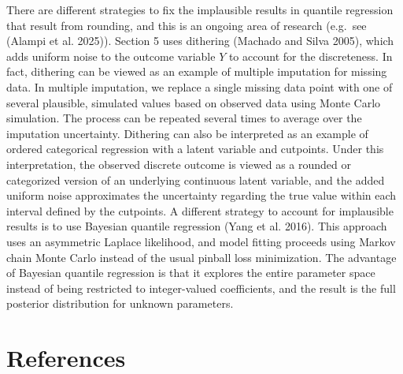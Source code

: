\documentclass[
  letterpaper,
  DIV=11,
  numbers=noendperiod]{scrartcl}
\begin{document}
There are different strategies to fix the implausible results in
quantile regression that result from rounding, and this is an ongoing
area of research (e.g.~see (Alampi et al. 2025)). Section 5 uses
dithering (Machado and Silva 2005), which adds uniform noise to the
outcome variable \(Y\) to account for the discreteness. In fact,
dithering can be viewed as an example of multiple imputation for missing
data. In multiple imputation, we replace a single missing data point
with one of several plausible, simulated values based on observed data
using Monte Carlo simulation. The process can be repeated several times
to average over the imputation uncertainty. Dithering can also be
interpreted as an example of ordered categorical regression with a
latent variable and cutpoints. Under this interpretation, the observed
discrete outcome is viewed as a rounded or categorized version of an
underlying continuous latent variable, and the added uniform noise
approximates the uncertainty regarding the true value within each
interval defined by the cutpoints. A different strategy to account for
implausible results is to use Bayesian quantile regression (Yang et al.
2016). This approach uses an asymmetric Laplace likelihood, and model
fitting proceeds using Markov chain Monte Carlo instead of the usual
pinball loss minimization. The advantage of Bayesian quantile regression
is that it explores the entire parameter space instead of being
restricted to integer-valued coefficients, and the result is the full
posterior distribution for unknown parameters.

\section*{References}\label{references}
\end{document}
